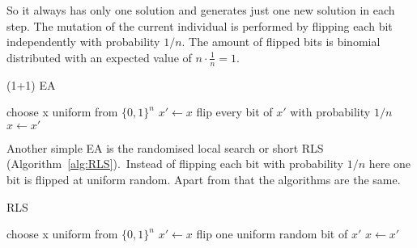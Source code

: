 So it always has only one solution and generates just one new solution in each step.
The mutation of the current individual is performed by flipping each bit independently with probability $1/n$.
The amount of flipped bits is binomial distributed with an expected value of $n\cdot\frac{1}{n}=1$.
\begin{algorithm}[bt]
      \caption{\textsc{(1+1) EA}}\label{alg:EA}

      \DontPrintSemicolon %

      \BlankLine
      choose x uniform from ${\{0,1\}}^n$\;
      {
      $x' \leftarrow x$\;
      flip every bit of $x'$ with probability $1/n$\;
      {
      {
            $x \leftarrow x'$\;
      }
      }
      }
\end{algorithm}
Another simple EA is the randomised local search or short RLS (Algorithm~\ref{alg:RLS}).\
Instead of flipping each bit with probability $1/n$ here one bit is flipped at uniform random.
Apart from that the algorithms are the same.
\begin{algorithm}[bt]
      \caption{\textsc{RLS}}\label{alg:RLS}

      \DontPrintSemicolon %

      \BlankLine
      choose x uniform from ${\{0,1\}}^n$\;
      {
      $x' \leftarrow x$\;
      flip one uniform random bit of $x'$\;
      {
      {
            $x \leftarrow x'$\;
      }
      }
      }
\end{algorithm}

